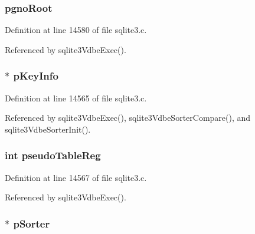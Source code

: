 \subsubsection[{pgno\+Root}]{ pgno\+Root}\label{struct_vdbe_cursor_a30f00f9ff785feab4d71f2cf58faab84}


Definition at line 14580 of file sqlite3.\+c.



Referenced by sqlite3\+Vdbe\+Exec().

\hypertarget{struct_vdbe_cursor_a2394c1e8402fe40753205256757b4165}{}
\subsubsection[{p\+Key\+Info}]{$\ast$ p\+Key\+Info}\label{struct_vdbe_cursor_a2394c1e8402fe40753205256757b4165}


Definition at line 14565 of file sqlite3.\+c.



Referenced by sqlite3\+Vdbe\+Exec(), sqlite3\+Vdbe\+Sorter\+Compare(), and sqlite3\+Vdbe\+Sorter\+Init().

\hypertarget{struct_vdbe_cursor_a2db26c350377e5259405e33aceae08fe}{}
\subsubsection[{pseudo\+Table\+Reg}]{\setlength{\rightskip}{0pt plus 5cm}int pseudo\+Table\+Reg}\label{struct_vdbe_cursor_a2db26c350377e5259405e33aceae08fe}


Definition at line 14567 of file sqlite3.\+c.



Referenced by sqlite3\+Vdbe\+Exec().

\hypertarget{struct_vdbe_cursor_a4be97d7a48d4328b3f5339ebf2d6aa25}{}
\subsubsection[{p\+Sorter}]{$\ast$ p\+Sorter}\label{struct_vdbe_cursor_a4be97d7a48d4328b3f5339ebf2d6aa25}


